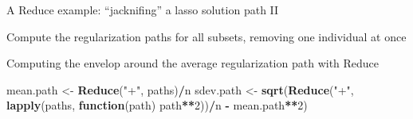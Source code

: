 \documentclass[10pt,ignorenonframetext,]{beamer}
\newenvironment{Shaded}{\begin{snugshade}}{\end{snugshade}}
\newcommand{\KeywordTok}[1]{\textcolor[rgb]{0.13,0.29,0.53}{\textbf{#1}}}
\newcommand{\DataTypeTok}[1]{\textcolor[rgb]{0.13,0.29,0.53}{#1}}
\newcommand{\DecValTok}[1]{\textcolor[rgb]{0.00,0.00,0.81}{#1}}
\newcommand{\StringTok}[1]{\textcolor[rgb]{0.31,0.60,0.02}{#1}}
\newcommand{\ControlFlowTok}[1]{\textcolor[rgb]{0.13,0.29,0.53}{\textbf{#1}}}
\newcommand{\OperatorTok}[1]{\textcolor[rgb]{0.81,0.36,0.00}{\textbf{#1}}}
\newcommand{\NormalTok}[1]{#1}
\begin{document}
\begin{frame}{A Reduce example: ``jacknifing''
a lasso solution path II}

Compute the regularization paths for all subsets, removing one
individual at once

\scriptsize

\begin{Shaded}
\end{Shaded}

\normalsize

Computing the envelop around the average regularization path with Reduce

\scriptsize

\begin{Shaded}
\begin{Highlighting}[]
\NormalTok{mean.path <-}\StringTok{ }\KeywordTok{Reduce}\NormalTok{(}\StringTok{"+"}\NormalTok{, paths)}\OperatorTok{/}\NormalTok{n}
\NormalTok{sdev.path <-}\StringTok{ }\KeywordTok{sqrt}\NormalTok{(}\KeywordTok{Reduce}\NormalTok{(}\StringTok{"+"}\NormalTok{, }\KeywordTok{lapply}\NormalTok{(paths, }\ControlFlowTok{function}\NormalTok{(path) path}\OperatorTok{**}\DecValTok{2}\NormalTok{))}\OperatorTok{/}\NormalTok{n }\OperatorTok{-}\StringTok{ }
\StringTok{                  }\NormalTok{mean.path}\OperatorTok{**}\DecValTok{2}\NormalTok{)}
\end{Highlighting}
\end{Shaded}

\normalsize

\scriptsize


\end{frame}
\end{document}
